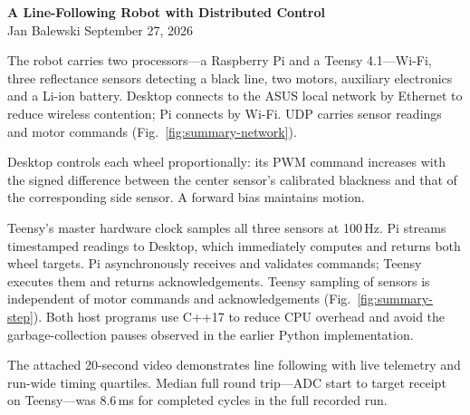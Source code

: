 \documentclass[10pt,letterpaper]{article}
\begin{document}
\begin{center}
{\Large\bfseries A Line-Following Robot with Distributed Control}\\[3pt]
Jan Balewski \hfill September 27, 2026
\end{center}
\vspace{-5pt}

The robot carries two
processors---a Raspberry Pi and a Teensy 4.1---Wi-Fi, three reflectance sensors
detecting a black line, two motors, auxiliary electronics and a Li-ion battery.
Desktop connects to the ASUS local network by Ethernet to reduce wireless
contention; Pi connects by Wi-Fi. UDP carries sensor readings and motor commands
(Fig.~\ref{fig:summary-network}).

Desktop controls each wheel proportionally: its PWM command increases with the
signed difference between the center sensor's calibrated blackness and that of
the corresponding side sensor. A forward bias maintains motion.

Teensy's master hardware clock samples all three sensors at 100\,Hz. Pi streams
timestamped readings to Desktop, which immediately computes and returns both
wheel targets. Pi asynchronously receives and validates commands; Teensy executes
them and returns acknowledgements. Teensy sampling of sensors is independent
of motor commands and acknowledgements (Fig.~\ref{fig:summary-step}). Both host
programs use C++17 to reduce CPU overhead and avoid the garbage-collection pauses
observed in the earlier Python implementation.

The attached 20-second video demonstrates line following with live telemetry and
run-wide timing quartiles. Median full round trip---ADC start to target receipt
on Teensy---was 8.6\,ms for completed cycles in the full recorded run.
\end{document}
